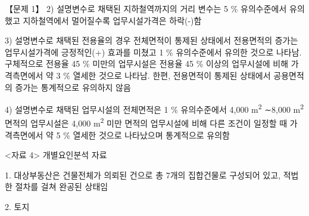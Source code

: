 \begin{longquestion}{【문제 1】}
2) 설명변수로 채택된 지하철역까지의 거리 변수는 5 \% 유의수준에서 유의했고 지하철역에서 멀어질수록 업무시설가격은 하락(-)함 \par
3) 설명변수로 채택된 전용율의 경우 전체면적이 통제된 상태에서 전용면적의 증가는 업무시설가격에 긍정적인(+) 효과를 미쳤고 1 \% 유의수준에서 유의한 것으로 나타남. 구체적으로 전용율 45 \% 미만의 업무시설은 전용율 45 \% 이상의 업무시설에 비해 가격측면에서 약 3 \% 열세한 것으로 나타남. 한편, 전용면적이 통제된 상태에서 공용면적의 증가는 통계적으로 유의하지 않음 \par
4) 설명변수로 채택된 업무시설의 전체면적은 1 \% 유의수준에서 4,000 m\textsuperscript{2} ∼8,000 m\textsuperscript{2} 면적의 업무시설은 4,000 m\textsuperscript{2} 미만 면적의 업무시설에 비해 다른 조건이 일정할 때 가격측면에서 약 5 \% 열세한 것으로 나타났으며 통계적으로 유의함 \par
<자료 4> 개별요인분석 자료 \par
1. 대상부동산은 건물전체가 의뢰된 건으로 총 7개의 집합건물로 구성되어 있고, 적법한 절차를 걸쳐 완공된 상태임 \par
2. 토지 \par
{\small\centering
{}\par}


\end{longquestion}
